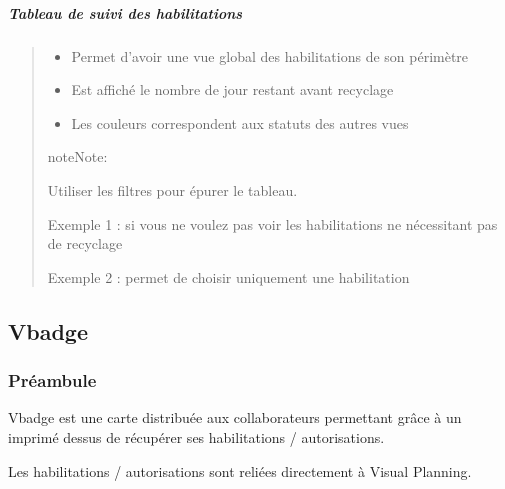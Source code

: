 \documentclass[letterpaper,10pt,english]{sphinxmanual}
\begin{document}
\subparagraph{Tableau de suivi des habilitations}
\label{\detokenize{fonctionnalitees/habilitation_formation:tableau-de-suivi-des-habilitations}}\begin{quote}

\noindent{}
\begin{itemize}
\item {} 
Permet d’avoir une vue global des habilitations de son périmètre

\item {} 
Est affiché le nombre de jour restant avant recyclage

\item {} 
Les couleurs correspondent aux statuts des autres vues

\end{itemize}

\begin{sphinxadmonition}{note}{Note:}
\begin{DUlineblock}{0em}
\item[] Utiliser les filtres pour épurer le tableau.
\item[] Exemple 1 :  si vous ne voulez pas voir les habilitations ne nécessitant pas de recyclage
\item[] Exemple 2 :  permet de choisir uniquement une habilitation
\end{DUlineblock}
\end{sphinxadmonition}
\end{quote}


\subsection{Vbadge}
\label{\detokenize{fonctionnalitees/vbadge:vbadge}}\label{\detokenize{fonctionnalitees/vbadge::doc}}

\subsubsection{Préambule}
\label{\detokenize{fonctionnalitees/vbadge:preambule}}
Vbadge est une carte distribuée aux collaborateurs permettant grâce à un  imprimé dessus de récupérer ses habilitations / autorisations.

Les habilitations / autorisations sont reliées directement à Visual Planning.
\end{document}
